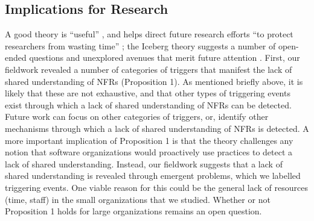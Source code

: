 \documentclass[smallextended]{svjour3}        %
\providecommand{\DIFaddtex}[1]{{\protect\color{blue}\uwave{#1}}} %
\providecommand{\DIFaddbegin}{} %
\providecommand{\DIFaddend}{} %
\providecommand{\DIFadd}[1]{\texorpdfstring{\DIFaddtex{#1}}{#1}} %
\newcommand{\DIFaddincludegraphics}[2][]{{\color{blue}\fbox{\DIFOincludegraphics[#1]{#2}}}} %
\DeclareRobustCommand{\DIFaddbegin}{\DIFOaddbegin \let\includegraphics\DIFaddincludegraphics} %
\DeclareRobustCommand{\DIFaddend}{\DIFOaddend \let\includegraphics\DIFOincludegraphics} %
\begin{document}

\DIFaddend \subsection{Implications for Research}
\label{academic}

A good theory  is ``useful'' \citep{mintzberg2017developing}, and helps direct future research efforts ``to protect researchers from wasting time'' \cite[p. 8]{miner1980}; the Iceberg theory suggests a number of open-ended questions and unexplored avenues that merit future attention \DIFaddbegin \DIFadd{(see Table~\ref{tab:implications})}\DIFaddend .
First, our fieldwork revealed a number of categories of triggers that manifest the lack of shared understanding of NFRs (Proposition 1). As mentioned briefly above, it is likely that these are not exhaustive, and that other types of triggering events exist through which a lack of shared understanding of NFRs can be detected. 
Future work can focus on other categories of triggers, or, identify other mechanisms through which a lack of shared understanding of NFRs is detected.
A more important implication of Proposition 1 is that the theory challenges any notion that software organizations would proactively use practices to detect a lack of shared understanding. Instead, our fieldwork suggests that a lack of shared understanding is revealed through emergent problems, which we labelled triggering events. One viable reason for this could be the general lack of resources (time, staff) in the small organizations that we studied. Whether or not Proposition 1 holds for large organizations remains an open question.
\end{document}
